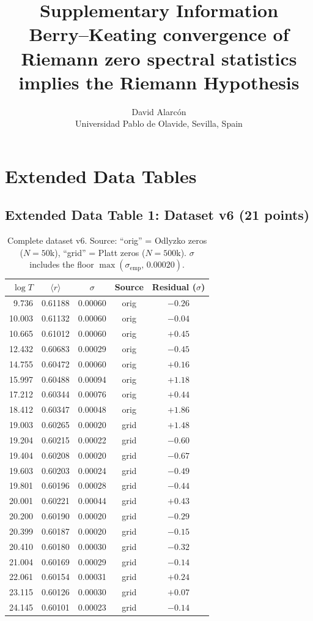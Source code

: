 \documentclass[10pt]{article}
\title{\textbf{Supplementary Information}\\[5pt]
\large Berry--Keating convergence of Riemann zero spectral statistics implies the Riemann Hypothesis}
\author{David Alarc\'on\\
\small Universidad Pablo de Olavide, Sevilla, Spain}
\date{}
\begin{document}
\maketitle
\tableofcontents
\newpage


\section{Extended Data Tables}

\subsection{Extended Data Table 1: Dataset v6 (21 points)}

\begin{table}[h]
\centering
\caption{Complete dataset v6. Source: ``orig'' = Odlyzko zeros ($N = 50$k),
``grid'' = Platt zeros ($N = 500$k). $\sigma$ includes the floor
$\max(\sigma_{\mathrm{emp}},\, 0.00020)$.}
\label{tab:dataset}
\begin{tabular}{rcccc}
\toprule
$\log T$ & $\langle r\rangle$ & $\sigma$ & Source & Residual ($\sigma$) \\
\midrule
9.736  & 0.61188 & 0.00060 & orig & $-0.26$ \\
10.003 & 0.61132 & 0.00060 & orig & $-0.04$ \\
10.665 & 0.61012 & 0.00060 & orig & $+0.45$ \\
12.432 & 0.60683 & 0.00029 & orig & $-0.45$ \\
14.755 & 0.60472 & 0.00060 & orig & $+0.16$ \\
15.997 & 0.60488 & 0.00094 & orig & $+1.18$ \\
17.212 & 0.60344 & 0.00076 & orig & $+0.44$ \\
18.412 & 0.60347 & 0.00048 & orig & $+1.86$ \\
19.003 & 0.60265 & 0.00020 & grid & $+1.48$ \\
19.204 & 0.60215 & 0.00022 & grid & $-0.60$ \\
19.404 & 0.60208 & 0.00020 & grid & $-0.67$ \\
19.603 & 0.60203 & 0.00024 & grid & $-0.49$ \\
19.801 & 0.60196 & 0.00028 & grid & $-0.44$ \\
20.001 & 0.60221 & 0.00044 & grid & $+0.43$ \\
20.200 & 0.60190 & 0.00020 & grid & $-0.29$ \\
20.399 & 0.60187 & 0.00020 & grid & $-0.15$ \\
20.410 & 0.60180 & 0.00030 & grid & $-0.32$ \\
21.004 & 0.60169 & 0.00029 & grid & $-0.14$ \\
22.061 & 0.60154 & 0.00031 & grid & $+0.24$ \\
23.115 & 0.60126 & 0.00030 & grid & $+0.07$ \\
24.145 & 0.60101 & 0.00023 & grid & $-0.14$ \\
\bottomrule
\end{tabular}
\end{table}
\end{document}
